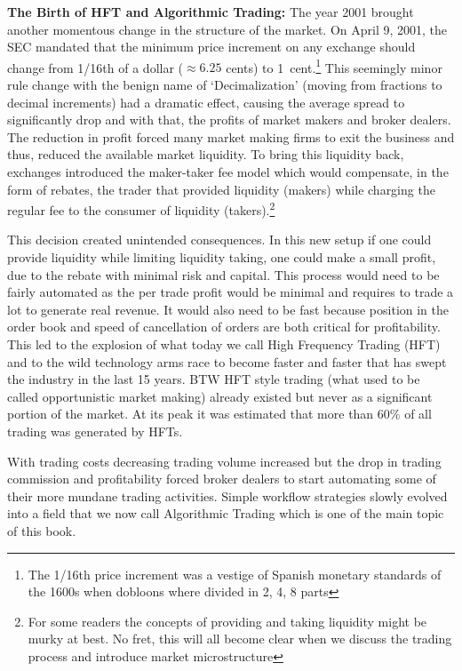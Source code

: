 \noindent\textbf{The Birth of HFT and Algorithmic Trading:} The year 2001 brought another momentous change in the structure of the market. On April 9, 2001, the SEC mandated that the minimum price increment on any exchange should change from 1/16th of a dollar ($\approx6.25$ cents) to 1~cent.\footnote{ The 1/16th price increment was a vestige of Spanish monetary standards of the 1600s when dobloons where divided in 2, 4, 8 parts} This seemingly minor rule change with the benign name of `Decimalization' (moving from fractions to decimal increments) had a dramatic effect, causing the average spread to significantly drop and with that, the profits of market makers and broker dealers. The reduction in profit forced many market making firms to exit the business and thus, reduced the  available market liquidity. To bring this liquidity back, exchanges introduced the maker-taker fee model which would compensate, in the form of rebates, the trader that provided liquidity (makers) while charging the regular fee to the consumer of liquidity (takers).\footnote{For some readers the concepts of providing and taking liquidity might be murky at best. No fret, this will all become clear when we discuss the trading process and introduce market microstructure}


This decision created unintended consequences. In this new setup if one could provide liquidity while limiting liquidity taking, one could make a small profit, due to the rebate with minimal risk and capital. This process would need to be fairly automated as the per trade profit would be minimal and requires to trade a lot to generate real revenue. It would also need to be fast because position in the order book and speed of cancellation of orders are both critical for profitability. This led to the explosion of what today we call High Frequency Trading (HFT) and to the wild technology arms race to become faster and faster that has swept the industry in the last 15 years. BTW HFT style trading (what used to be called opportunistic market making) already existed but never as a significant portion of the market. At its peak it was estimated that more than 60\% of all trading was generated by HFTs.


With trading costs decreasing trading volume increased but the drop in trading commission and profitability forced broker dealers to start automating some of their more mundane trading activities. Simple workflow strategies slowly evolved into a field that we now call Algorithmic Trading which is one of the main topic of this book. \\


